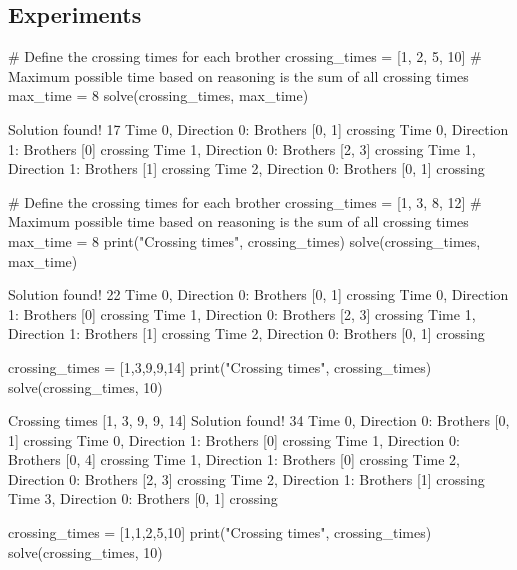 \subsection{Experiments}

\begin{python}
# Define the crossing times for each brother
crossing_times = [1, 2, 5, 10]
# Maximum possible time based on reasoning is the sum of all crossing times
max_time = 8
solve(crossing_times, max_time)
\end{python}

\begin{result}
Solution found! 17
Time 0, Direction 0: Brothers [0, 1] crossing
Time 0, Direction 1: Brothers [0] crossing
Time 1, Direction 0: Brothers [2, 3] crossing
Time 1, Direction 1: Brothers [1] crossing
Time 2, Direction 0: Brothers [0, 1] crossing
\end{result}

\begin{python}
# Define the crossing times for each brother
crossing_times = [1, 3, 8, 12]
# Maximum possible time based on reasoning is the sum of all crossing times
max_time = 8
print("Crossing times", crossing_times)
solve(crossing_times, max_time)
\end{python}

\begin{result}
[1, 3, 8, 12]
Solution found! 22
Time 0, Direction 0: Brothers [0, 1] crossing
Time 0, Direction 1: Brothers [0] crossing
Time 1, Direction 0: Brothers [2, 3] crossing
Time 1, Direction 1: Brothers [1] crossing
Time 2, Direction 0: Brothers [0, 1] crossing
\end{result}

\begin{python}
crossing_times = [1,3,9,9,14]
print("Crossing times", crossing_times)
solve(crossing_times, 10)
\end{python}

\begin{result}
Crossing times [1, 3, 9, 9, 14]
Solution found! 34
Time 0, Direction 0: Brothers [0, 1] crossing
Time 0, Direction 1: Brothers [0] crossing
Time 1, Direction 0: Brothers [0, 4] crossing
Time 1, Direction 1: Brothers [0] crossing
Time 2, Direction 0: Brothers [2, 3] crossing
Time 2, Direction 1: Brothers [1] crossing
Time 3, Direction 0: Brothers [0, 1] crossing
\end{result}

\begin{python}
crossing_times = [1,1,2,5,10]
print("Crossing times", crossing_times)
solve(crossing_times, 10)
\end{python}

